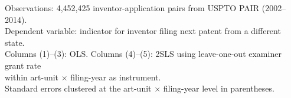 \begin{table}[htbp]
   \par \raggedright 
   Observations: 4,452,425 inventor-application pairs from USPTO PAIR (2002--2014). \\
   Dependent variable: indicator for inventor filing next patent from a different state. \\
   Columns (1)--(3): OLS. Columns (4)--(5): 2SLS using leave-one-out examiner grant rate \\
   within art-unit $\times$ filing-year as instrument. \\
   Standard errors clustered at the art-unit $\times$ filing-year level in parentheses.
\end{table}


